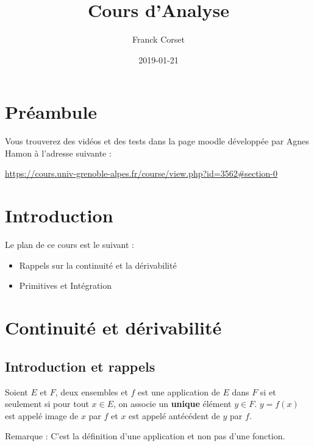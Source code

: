 \documentclass[]{book}
\title{Cours d'Analyse}
\author{Franck Corset}
\date{2019-01-21}
\theoremstyle{definition}
\theoremstyle{definition}
\theoremstyle{definition}
\theoremstyle{remark}
\let\BeginKnitrBlock\begin \let\EndKnitrBlock\end
\begin{document}
\maketitle

{
\setcounter{tocdepth}{1}
\tableofcontents
}
\hypertarget{preambule}{%
\chapter{Préambule}\label{preambule}}

Vous trouverez des vidéos et des tests dans la page moodle développée par Agnes Hamon à l'adresse suivante :

\url{https://cours.univ-grenoble-alpes.fr/course/view.php?id=3562\#section-0}

\hypertarget{intro}{%
\chapter{Introduction}\label{intro}}

Le plan de ce cours est le suivant :

\begin{itemize}
\item
  Rappels sur la continuité et la dérivabilité
\item
  Primitives et Intégration
\end{itemize}

\hypertarget{continuite-et-derivabilite}{%
\chapter{Continuité et dérivabilité}\label{continuite-et-derivabilite}}

\hypertarget{introduction-et-rappels}{%
\section{Introduction et rappels}\label{introduction-et-rappels}}

\BeginKnitrBlock{definition}[Application]
\protect\hypertarget{def:unnamed-chunk-1}{}{\label{def:unnamed-chunk-1} \iffalse (Application) \fi{} }Soient \(E\) et \(F\), deux ensembles et \(f\) est une application de \(E\) dans \(F\) si et seulement si pour tout \(x\in E\), on associe un \textbf{unique} élément \(y\in F\). \(y=f(x)\) est appelé image de \(x\) par \(f\) et \(x\) est appelé antécédent de \(y\) par \(f\).
\EndKnitrBlock{definition}

Remarque : C'est la définition d'une application et non pas d'une fonction.
\end{document}
